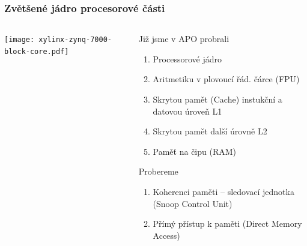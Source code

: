 \documentclass{beamer}
\begin{document}
\begin{frame}
\frametitle{Zvětšené jádro procesorové části}
\begin{columns}
\begin{column}{0.6\textwidth}
  \begin{center}
    \texttt{[image: xylinx-zynq-7000-block-core.pdf]}
  \end{center}
  \vfil
\end{column}
\begin{column}{0.4\textwidth}
 {
 \footnotesize
 Již jsme v APO probrali
 \begin{enumerate}
  \item Processorové jádro
  \item Aritmetiku v plovoucí řád. čárce (FPU)
  \item Skrytou pamět (Cache) instukční a datovou úroveň L1
  \item Skrytou pamět další úrovně L2
  \item Paměť na čipu (RAM)
 \end{enumerate}
 Probereme
 \begin{enumerate}
  \item Koherenci paměti -- sledovací jednotka (Snoop Control Unit)
  \item Přímý přístup k paměti (Direct Memory Access)
 \end{enumerate}
 }
\end{column}
\end{columns}
\end{frame}
\end{document}
